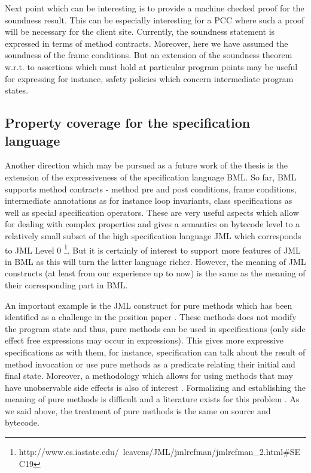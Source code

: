 Next point which can be interesting is to provide a machine checked proof for the soundness result. 
This can be especially interesting for a PCC where such a proof will be necessary for the client site. 
Currently, the soundness statement is expressed in terms of method contracts. 
Moreover, here we have assumed the soundness of the frame conditions.
But an extension  of the soundness theorem w.r.t. to assertions which must hold at particular program points may be useful for
expressing for instance, safety policies which concern intermediate program states.


\subsection{Property coverage for the specification language}
Another direction which may be pursued as a future work of the thesis  is the extension of the expressiveness of the specification language BML. 
So far, BML supports method contracts - method pre and post  conditions, frame conditions, intermediate annotations as for instance
loop invariants, class specifications as well as special specification operators.
These are very useful aspects which allow for dealing with complex properties and 
gives a semantics on bytecode level  to a relatively small subset of the 
high specification language JML which corresponds to JML Level 0 \footnote{ http://www.cs.iastate.edu/~leavens/JML/jmlrefman/jmlrefman\_2.html\#SEC19}. 
 But it is certainly of interest to support more features of JML in BML
as this will turn the latter language richer. However, the meaning  of JML constructs 
(at least from our experience up to  now) is the same as the meaning of their corresponding part in BML.  

 An important example is the  JML construct for pure methods which has been  identified as  a challenge in the position paper \cite{LeavensLeinoMueller06}. 
 These methods does not modify the program state and thus, pure methods can be used in specifications 
 (only side effect free  expressions may occur in expressions).
 This gives more expressive  specifications as with them, for instance, specification can talk about the result of method invocation or use pure methods
 as a predicate relating their  initial and final state.
 Moreover, a methodology which allows for using methods that may have unobservable side effects is also of interest \cite{obspure}.
 Formalizing and establishing the meaning of pure methods is difficult and a literature exists for this problem \cite{DarvasMueller06}.
 As we said above, the treatment of pure methods is the same on source and bytecode.

